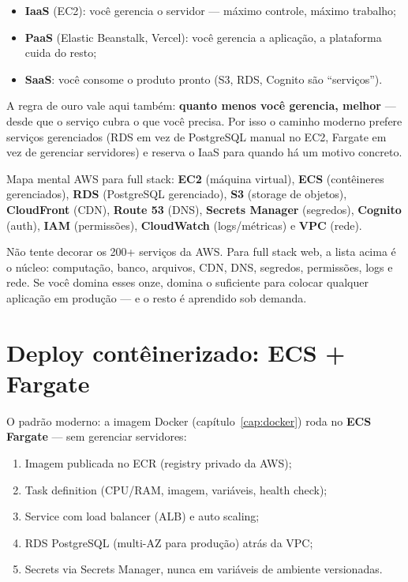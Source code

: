 \begin{itemize}[leftmargin=*, itemsep=0.4em]
  \item \textbf{IaaS} (EC2): você gerencia o servidor — máximo controle, máximo trabalho;
  \item \textbf{PaaS} (Elastic Beanstalk, Vercel): você gerencia a aplicação, a plataforma cuida do resto;
  \item \textbf{SaaS}: você consome o produto pronto (S3, RDS, Cognito são ``serviços'').
\end{itemize}

A regra de ouro vale aqui também: \textbf{quanto menos você gerencia, melhor}
— desde que o serviço cubra o que você precisa. Por isso o caminho moderno
prefere serviços gerenciados (RDS em vez de PostgreSQL manual no EC2, Fargate
em vez de gerenciar servidores) e reserva o IaaS para quando há um motivo
concreto.

\begin{caixaconceito}
Mapa mental AWS para full stack: \textbf{EC2} (máquina virtual), \textbf{ECS}
(contêineres gerenciados), \textbf{RDS} (PostgreSQL gerenciado), \textbf{S3}
(storage de objetos), \textbf{CloudFront} (CDN), \textbf{Route 53} (DNS),
\textbf{Secrets Manager} (segredos), \textbf{Cognito} (auth), \textbf{IAM}
(permissões), \textbf{CloudWatch} (logs/métricas) e \textbf{VPC} (rede).
\end{caixaconceito}

\begin{caixadica}
Não tente decorar os 200+ serviços da AWS. Para full stack web, a lista acima
é o núcleo: computação, banco, arquivos, CDN, DNS, segredos, permissões,
logs e rede. Se você domina esses onze, domina o suficiente para colocar
qualquer aplicação em produção — e o resto é aprendido sob demanda.
\end{caixadica}

\section{Deploy contêinerizado: ECS + Fargate}

O padrão moderno: a imagem Docker (capítulo~\ref{cap:docker}) roda no
\textbf{ECS Fargate} — sem gerenciar servidores:

\begin{enumerate}[leftmargin=*, itemsep=0.4em]
  \item Imagem publicada no ECR (registry privado da AWS);
  \item Task definition (CPU/RAM, imagem, variáveis, health check);
  \item Service com load balancer (ALB) e auto scaling;
  \item RDS PostgreSQL (multi-AZ para produção) atrás da VPC;
  \item Secrets via Secrets Manager, nunca em variáveis de ambiente versionadas.
\end{enumerate}

